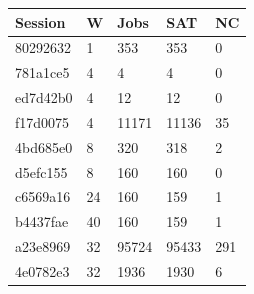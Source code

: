 \begin{tabular}{lllll}
\hline
Session & W & Jobs & SAT & NC \\
\hline
80292632 & 1 & 353 & 353 & 0 \\
781a1ce5 & 4 & 4 & 4 & 0 \\
ed7d42b0 & 4 & 12 & 12 & 0 \\
f17d0075 & 4 & 11171 & 11136 & 35 \\
4bd685e0 & 8 & 320 & 318 & 2 \\
d5efc155 & 8 & 160 & 160 & 0 \\
c6569a16 & 24 & 160 & 159 & 1 \\
b4437fae & 40 & 160 & 159 & 1 \\
a23e8969 & 32 & 95724 & 95433 & 291 \\
4e0782e3 & 32 & 1936 & 1930 & 6 \\
\hline
\end{tabular}

